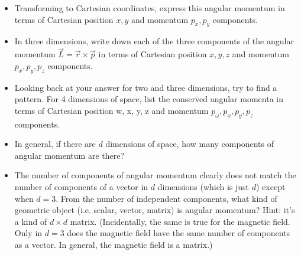 \documentclass[fleqn]{article}
\begin{document}
\begin{enumerate}
\begin{itemize}
      \item Transforming to Cartesian coordinates, express this angular momentum in terms of Cartesian position
      $x, y$ and momentum $p_x, p_y$ components.

      \item In three dimensions, write down each of the three components of
      the angular momentum $\overrightarrow{L}=\overrightarrow{r} \times \overrightarrow{p}$ in terms of Cartesian position
      $x,y,z$ and momentum $p_x, p_y, p_z$ components.

      \item Looking back at your answer for two and three dimensions, try
      to find a pattern. For 4 dimensions of space, list the conserved
      angular momenta in terms of Cartesian position w, x, y, z and momentum $p_{\omega}, p_x, p_y,p_z$ components.

      \item In general, if there are $d$ dimensions of space, how many components of angular momentum are there?


      \item The number of components of angular momentum clearly does not match the number of components of a vector in $d$ dimensions
      (which is just $d$) except when $d=3$. From the number of independent components, what kind of geometric object (i.e. scalar,
      vector, matrix) is angular momentum?
      Hint: it’s a kind of $d \times d$ matrix. (Incidentally, the same is true for the magnetic field. Only 
      in $d=3$ does the magnetic field have the same number of components as a vector. In general, the magnetic field is a matrix.)
  
    \end{itemize}
    
  \end{enumerate}
\end{document}
